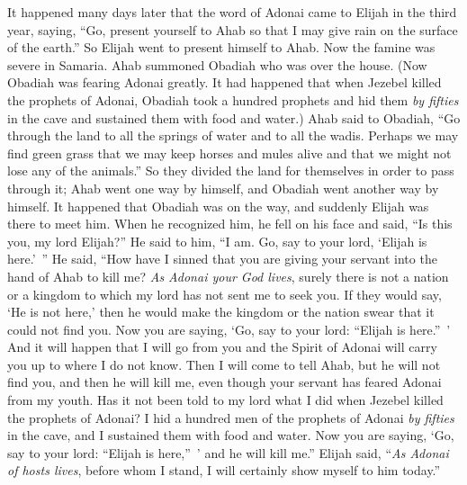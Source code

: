 \begin{biblechapter} %
 It happened many days later that the word of Adonai came to Elijah in the third year, saying, “Go, present yourself to Ahab so that I may give rain on the surface of the earth.”
\verse So Elijah went to present himself to Ahab. Now the famine was severe in Samaria.
\verse Ahab summoned Obadiah who was over the house. (Now Obadiah was fearing Adonai greatly.
\verse It had happened that when Jezebel killed the prophets of Adonai, Obadiah took a hundred prophets and hid them \textit{by fifties} in the cave and sustained them with food and water.)
\verse Ahab said to Obadiah, “Go through the land to all the springs of water and to all the wadis. Perhaps we may find green grass that we may keep horses and mules alive and that we might not lose any of the animals.”
\verse So they divided the land for themselves in order to pass through it; Ahab went one way by himself, and Obadiah went another way by himself.
\verse It happened that Obadiah was on the way, and suddenly Elijah was there to meet him. When he recognized him, he fell on his face and said, “Is this you, my lord Elijah?”
\verse He said to him, “I am. Go, say to your lord, ‘Elijah is here.’ ”
\verse He said, “How have I sinned that you are giving your servant into the hand of Ahab to kill me?
\verse \textit{As Adonai your God lives}, surely there is not a nation or a kingdom to which my lord has not sent me to seek you. If they would say, ‘He is not here,’ then he would make the kingdom or the nation swear that it could not find you.
\verse Now you are saying, ‘Go, say to your lord: “Elijah is here.” ’
\verse And it will happen that I will go from you and the Spirit of Adonai will carry you up to where I do not know. Then I will come to tell Ahab, but he will not find you, and then he will kill me, even though your servant has feared Adonai from my youth.
\verse Has it not been told to my lord what I did when Jezebel killed the prophets of Adonai? I hid a hundred men of the prophets of Adonai \textit{by fifties} in the cave, and I sustained them with food and water.
\verse Now you are saying, ‘Go, say to your lord: “Elijah is here,” ’ and he will kill me.”
\verse Elijah said, “\textit{As Adonai of hosts lives}, before whom I stand, I will certainly show myself to him today.”

\end{biblechapter}
